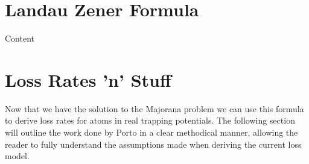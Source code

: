 \section{Landau Zener Formula}

Content

\section{Loss Rates 'n' Stuff} \label{sec:majorana_loss_rates}

Now that we have the solution to the Majorana problem we can use this formula to derive loss rates for atoms in real trapping potentials.
The following section will outline the work done by Porto \cite{Lin2009,Dubessy2014} in a clear methodical manner, allowing the reader to fully understand the assumptions made when deriving the current loss model.


